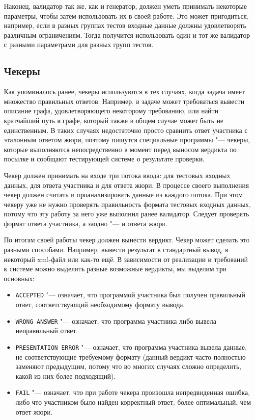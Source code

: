 Наконец, валидатор так же, как и генератор, должен уметь принимать некоторые параметры, чтобы затем использовать их в своей работе. Это может пригодиться, например, если в разных группах тестов входные данные должны удовлетворять различным ограничениям. Тогда получится использовать один и тот же валидатор с разными параметрами для разных групп тестов.

\subsection{Чекеры}

Как упоминалось ранее, чекеры используются в тех случаях, когда задача имеет множество правильных ответов. Например, в задаче может требоваться вывести описание графа, удовлетворяющего некоторому требованию, или найти кратчайший путь в графе, который также в общем случае может быть не единственным. В таких случаях недостаточно просто сравнить ответ участника с эталонным ответом жюри, поэтому пишутся специальные программы "--- чекеры, которые выполняются непосредственно в момент перед выносом вердикта по посылке и сообщают тестирующей системе о результате проверки.

Чекер должен принимать на входе три потока ввода: для тестовых входных данных, для ответа участника и для ответа жюри. В процессе своего выполнения чекер должен считать и проанализировать данные из каждого потока. При этом чекеру уже не нужно проверять правильность формата тестовых входных данных, потому что эту работу за него уже выполнил ранее валидатор. Следует проверять формат ответа участника, а заодно "--- и ответа жюри.

По итогам своей работы чекер должен вынести вердикт. Чекер может сделать это разными способами. Например, вывести результат в стандартный вывод, в некоторый xml-файл или как-то ещё. В зависимости от реализации и требований к системе можно выделить разные возможные вердикты, мы выделим три основных:

\begin{itemize}
\item \texttt{ACCEPTED} "--- означает, что программой участника был получен правильный ответ, соответствующий необходимому формату вывода.
\item \texttt{WRONG ANSWER} "--- означает, что программа участника либо вывела неправильный ответ.
\item \texttt{PRESENTATION ERROR} "--- означает, что программа участника вывела данные, не соответствующие требуемому формату (данный вердикт часто полностью заменяют предыдущим, потому что во многих случаях сложно определить, какой из них более подходящий).
\item \texttt{FAIL} "--- означает, что при работе чекера произошла непредвиденная ошибка, либо что участником было найден корректный ответ, более оптимальный, чем ответ жюри.
\end{itemize}

